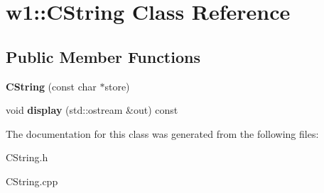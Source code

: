 \hypertarget{classw1_1_1_c_string}{}\section{w1\+:\+:C\+String Class Reference}
\label{classw1_1_1_c_string}
\subsection*{Public Member Functions}
\begin{DoxyCompactItemize}
\item 
\mbox{\label{classw1_1_1_c_string_ac0b5d3123afb15bb47e53ed1c3204b97}} 
{\bfseries C\+String} (const char $\ast$store)
\item 
\mbox{\label{classw1_1_1_c_string_aaf34d6cb795fdf1d793cb385d1ae0585}} 
void {\bfseries display} (std\+::ostream \&out) const
\end{DoxyCompactItemize}


The documentation for this class was generated from the following files\+:\begin{DoxyCompactItemize}
\item 
C\+String.\+h\item 
C\+String.\+cpp\end{DoxyCompactItemize}
